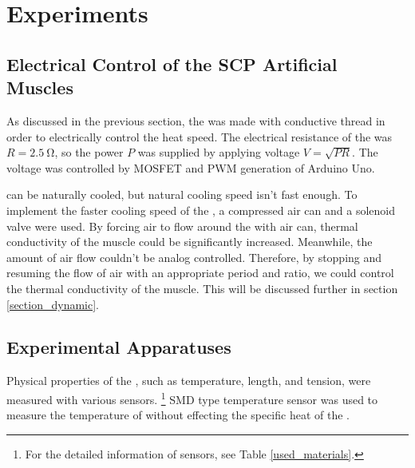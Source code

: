 
\section{Experiments}\label{section_experiments}

\subsection{Electrical Control of the SCP Artificial Muscles}\label{section_electrical_control}
As discussed in the previous section, the \scp was made with conductive thread in order to electrically control the heat speed. The electrical resistance of the \scp was $R=\SI{2.5}{\ohm}$, so the power $P$ was supplied by applying voltage $V=\sqrt{PR}$. The voltage was controlled by MOSFET and PWM generation of Arduino Uno.

\scp can be naturally cooled, but natural cooling speed isn't fast enough.
To implement the faster cooling speed of the \scpnospace, a compressed air can and a solenoid valve were used. 
By forcing air to flow around the \scp with air can, thermal conductivity of the muscle could be significantly increased.
Meanwhile, the amount of air flow couldn't be analog controlled. Therefore, by stopping and resuming the flow of air with an appropriate period and ratio, we could control the thermal conductivity of the muscle. This will be discussed further in section \ref{section_dynamic}.


\subsection{Experimental Apparatuses} \label{section_appa}

Physical properties of the \scpsnospace, such as temperature, length, and tension, were measured with various sensors.
\footnote{For the detailed information of sensors, see Table \ref{used_materials}.}
SMD type temperature sensor was used to measure the temperature of \scps without effecting the specific heat of the \scpnospace.

